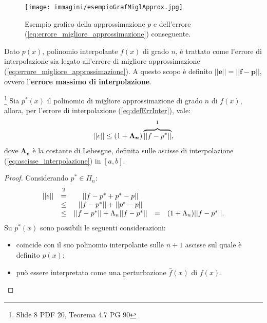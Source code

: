 \begin{figure}
    \centering
    \texttt{[image: immagini/esempioGrafMiglApprox.jpg]}
    \caption{Esempio grafico della approssimazione $p$ e dell'errore (\ref{eq:errore_migliore_approssimazione}) conseguente.}\label{fig:esempioGrafMiglApprox}
\end{figure}

Dato $p(x)$, polinomio interpolante $f(x)$ di grado $n$, è trattato come l'errore di interpolazione sia legato all'errore di migliore approssimazione (\ref{eq:errore_migliore_approssimazione}). A questo scopo è definito $\boldsymbol{||e||=||f-p||}$, ovvero l'\textbf{errore massimo di interpolazione}.

\begin{theorem}\label{th:approssimazione_errore_migliore_approssimazione}\footnote{Slide 8 PDF 20, Teorema 4.7 PG 90}
    Sia $p^*(x)$ il polinomio di migliore approssimazione di grado $n$ di $f(x)$, allora, per l'errore di interpolazione (\ref{eq:defErrInter}), vale:
    \begin{equation}\label{eq:approssimazione_errore_migliore_approssimazione}
        ||e||\leq (1+\boldsymbol{\Lambda_n})\overbrace{||f-p^*||}^{\footnotemark},
    \end{equation}
    dove $\boldsymbol{\Lambda_n}$ è la costante di Lebesgue, definita sulle ascisse di interpolazione (\ref{eq:ascisse_interpolazione}) in $[a, b]$.
\end{theorem}
\begin{proof}
Considerando $p^*\in\Pi_n$:
    \begin{equation*}
        \begin{matrix}
            ||e||&\overset{\footnotemark}{=}&||f-p^*+p^*-p||\\
            &\leq& ||f-p^*||+||p^*-p||\\
            &\leq& ||f-p^*||+\Lambda_n||f-p^*||
            &=&(1+\Lambda_n)||f-p^*||.
        \end{matrix}
    \end{equation*}
    Su $p^*(x)$ sono possibili le seguenti considerazioni:
    \begin{itemize}
        \item coincide con il suo polinomio interpolante sulle $n+1$ ascisse sul quale è definito $p(x)$;
        \item può essere interpretato come una perturbazione $\widehat f(x)$ di $f(x)$.
    \end{itemize}
\end{proof}

